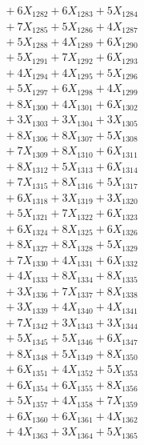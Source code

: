 \documentclass[a4paper,10pt]{article}
\begin{document}
{\begin{align}
&\;  + 6 X_{1282} + 6 X_{1283} + 5 X_{1284} \\[0.3ex]
&\;  + 7 X_{1285} + 5 X_{1286} + 4 X_{1287} \\[0.3ex]
&\;  + 5 X_{1288} + 4 X_{1289} + 6 X_{1290} \\[0.3ex]
&\;  + 5 X_{1291} + 7 X_{1292} + 6 X_{1293} \\[0.3ex]
&\;  + 4 X_{1294} + 4 X_{1295} + 5 X_{1296} \\[0.3ex]
&\;  + 5 X_{1297} + 6 X_{1298} + 4 X_{1299} \\[0.5ex]\allowbreak
&\;  + 8 X_{1300} + 4 X_{1301} + 6 X_{1302} \\[0.3ex]
&\;  + 3 X_{1303} + 3 X_{1304} + 3 X_{1305} \\[0.3ex]
&\;  + 8 X_{1306} + 8 X_{1307} + 5 X_{1308} \\[0.3ex]
&\;  + 7 X_{1309} + 8 X_{1310} + 6 X_{1311} \\[0.3ex]
&\;  + 8 X_{1312} + 5 X_{1313} + 6 X_{1314} \\[0.3ex]
&\;  + 7 X_{1315} + 8 X_{1316} + 5 X_{1317} \\[0.3ex]
&\;  + 6 X_{1318} + 3 X_{1319} + 3 X_{1320} \\[0.3ex]
&\;  + 5 X_{1321} + 7 X_{1322} + 6 X_{1323} \\[0.3ex]
&\;  + 6 X_{1324} + 8 X_{1325} + 6 X_{1326} \\[0.3ex]
&\;  + 8 X_{1327} + 8 X_{1328} + 5 X_{1329} \\[0.5ex]\allowbreak
&\;  + 7 X_{1330} + 4 X_{1331} + 6 X_{1332} \\[0.3ex]
&\;  + 4 X_{1333} + 8 X_{1334} + 8 X_{1335} \\[0.3ex]
&\;  + 3 X_{1336} + 7 X_{1337} + 8 X_{1338} \\[0.3ex]
&\;  + 3 X_{1339} + 4 X_{1340} + 4 X_{1341} \\[0.3ex]
&\;  + 7 X_{1342} + 3 X_{1343} + 3 X_{1344} \\[0.3ex]
&\;  + 5 X_{1345} + 5 X_{1346} + 6 X_{1347} \\[0.3ex]
&\;  + 8 X_{1348} + 5 X_{1349} + 8 X_{1350} \\[0.3ex]
&\;  + 6 X_{1351} + 4 X_{1352} + 5 X_{1353} \\[0.3ex]
&\;  + 6 X_{1354} + 6 X_{1355} + 8 X_{1356} \\[0.3ex]
&\;  + 5 X_{1357} + 4 X_{1358} + 7 X_{1359} \\[0.5ex]\allowbreak
&\;  + 6 X_{1360} + 6 X_{1361} + 4 X_{1362} \\[0.3ex]
&\;  + 4 X_{1363} + 3 X_{1364} + 5 X_{1365} \\[0.3ex]

\end{align}}
\end{document}
